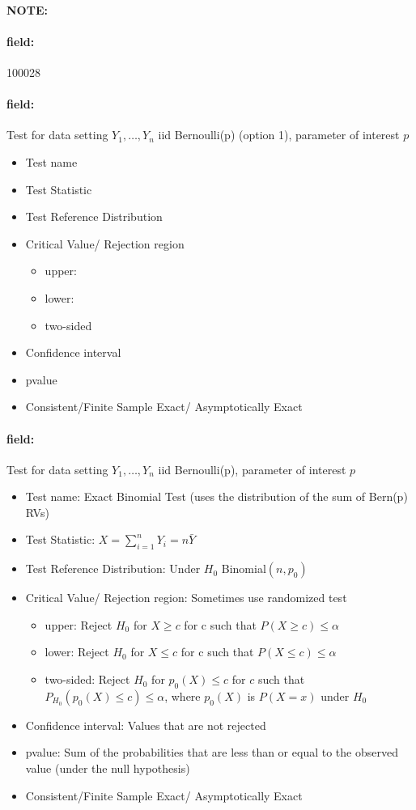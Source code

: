 \documentclass[12pt]{article}
\newenvironment{note}{\paragraph{NOTE:}}{}
\newenvironment{field}{\paragraph{field:}}{}
\begin{document}
\begin{note} \begin{field} \tiny 100028 \end{field}
 \begin{field}
  Test for data setting $Y_1, \ldots, Y_n$ iid Bernoulli(p) (option 1), parameter of interest $p$
  \begin{itemize}
   \item Test name
   \item Test Statistic
   \item Test Reference Distribution
   \item Critical Value/ Rejection region
         \begin{itemize}
          \item upper:
          \item lower:
          \item two-sided
         \end{itemize}
   \item Confidence interval
   \item pvalue
   \item Consistent/Finite Sample Exact/ Asymptotically Exact
  \end{itemize}
 \end{field}
 \begin{field}
  Test for data setting $Y_1, \ldots, Y_n$ iid Bernoulli(p), parameter of interest $p$
  \begin{itemize}
   \item Test name: Exact Binomial Test (uses the distribution of the sum of Bern(p) RVs)
   \item Test Statistic: $X = \sum_{i=1}^n Y_i = n\bar{Y}$
   \item Test Reference Distribution: Under $H_0$ Binomial$(n,p_0)$
   \item Critical Value/ Rejection region: Sometimes use randomized test
         \begin{itemize}
          \item upper: Reject $H_0$ for $X \geq c$ for c such that $P(X \geq c)\leq \alpha$
          \item lower: Reject $H_0$ for $X \leq c$ for c such that $P(X \leq c)\leq \alpha$
          \item two-sided: Reject $H_0$ for $p_0(X)\leq c$ for $c$ such that$P_{H_0}(p_0(X) \leq c)\leq \alpha$, where $p_0(X)$ is $P(X = x)$ under $H_0$
         \end{itemize}
   \item Confidence interval: Values that are not rejected
   \item pvalue: Sum of the probabilities that are less than or equal to the observed value (under the null hypothesis)
   \item Consistent/Finite Sample Exact/ Asymptotically Exact
  \end{itemize}
 \end{field}
\end{note}
\end{document}
